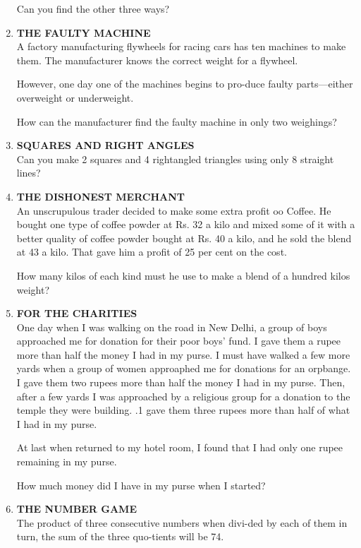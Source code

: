 \documentclass[12pt]{article}
\begin{document}
\begin{enumerate}
Can you find  the other  three  ways? 
%
\item \textbf{THE  FAULTY  MACHINE} \\
A factory  manufacturing  flywheels  for racing  cars  has ten machines  to make  them.  The  manufacturer  knows the correct  weight  for a flywheel. 

However,  one day  one  of the machines  begins  to pro-duce  faulty  parts—either  overweight  or underweight. 

How  can the manufacturer  find  the faulty  machine  in only two weighings? 
%
\item \textbf{SQUARES  AND  RIGHT  ANGLES} \\
Can you  make  2 squares  and  4 rightangled  triangles using  only  8 straight  lines? 
%
\item \textbf{THE  DISHONEST  MERCHANT} \\
An unscrupulous  trader  decided  to make  some  extra profit  oo Coffee.  He  bought  one type  of coffee  powder  at Rs. 32 a kilo  and mixed  some  of it with  a better  quality of coffee  powder  bought  at Rs.  40 a kilo,  and he sold the blend  at 43 a kilo.  That  gave  him  a profit  of 25 per cent  on the cost. 

How  many  kilos  of each  kind  must  he use to make  a blend  of a hundred  kilos  weight? 
%
\item \textbf{FOR  THE  CHARITIES} \\
One day when  I was  walking  on the road  in New  Delhi, a group  of boys  approached  me  for donation  for their poor  boys'  fund.  I gave  them  a rupee  more  than  half the money  I had in my purse.  I must  have  walked  a few more  yards  when  a group  of women  approaphed  me  for donations  for an orpbange.  I gave  them  two  rupees  more than half  the  money  I had  in my purse.  Then,  after  a few yards  I was  approached  by a religious  group  for a donation  to the temple  they  were  building.  .1 gave  them three  rupees  more  than  half of what  I had in my purse. 

At last when  returned  to my hotel  room,  I found  that I had only  one rupee  remaining  in my purse. 

How  much  money  did  I have  in my  purse  when  I started? 
%
\item \textbf{THE  NUMBER  GAME} \\
The product  of three  consecutive  numbers  when  divi-ded by each  of them  in turn,  the sum  of the three  quo-tients  will be 74. 


\end{enumerate}
\end{document}
